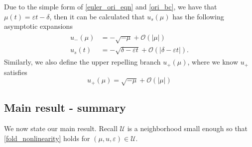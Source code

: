 \documentclass[letterpaper,11pt]{article}
\newcommand{\rmO}{\mathcal{O}}
\newcommand{\eps}{\varepsilon}
\numberwithin{equation}{section}
\theoremstyle{plain}
\begin{document}
Due to the simple form of \eqref{euler_ori_eqn} and \eqref{ori_bc}, we have that $\mu(t)= \eps t-\delta$, then it can be calculated that $u_s(\mu)$ has the following asymptotic expansions
\begin{align}\label{singularAsy}
\begin{split}
u_-(\mu) &= -\sqrt{-\mu} + \rmO(|\mu|)\\
u_s(t) &= -\sqrt{\delta-\eps t} + \rmO(|\delta-\eps t|).
\end{split}
\end{align}
Similarly, we also define the upper repelling branch $u_+(\mu)$, where we know $u_+$ satisfies
\begin{equation}
u_+(\mu) = \sqrt{-\mu} + \rmO(|\mu|) 
\end{equation}

\subsection{Main result - summary} \label{main_sum}

We now state our main result. Recall $\mathcal{U}$ is a neighborhood small enough so that \eqref{fold_nonlinearity} holds for $(\mu, u , \eps) \in \mathcal{U}$.
\end{document}
